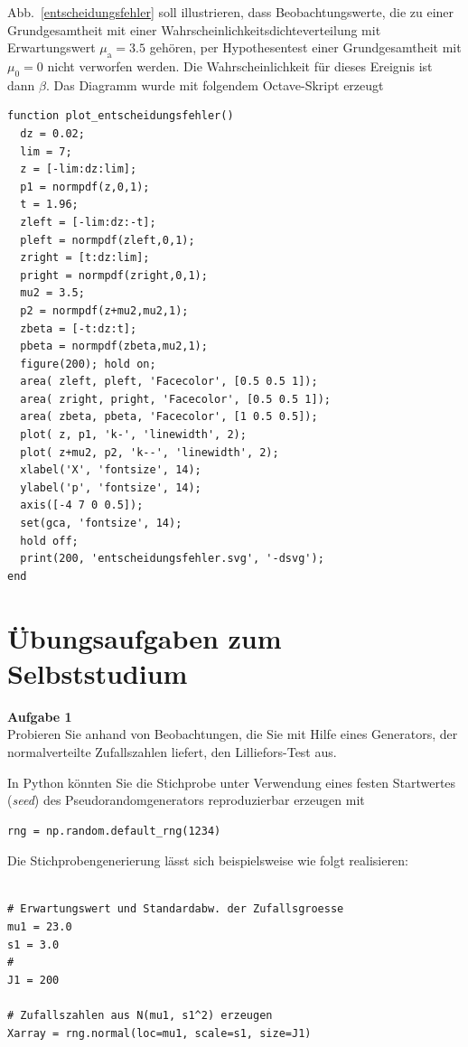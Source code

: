 Abb.~\ref{entscheidungsfehler} soll illustrieren, dass Beobachtungswerte, die zu einer
Grundgesamtheit mit einer Wahrscheinlichkeitsdichteverteilung mit Erwartungswert
$\mu_\mathrm{a} = 3.5$ gehören, per Hypothesentest einer Grundgesamtheit mit $\mu_0 = 0$
nicht verworfen werden. Die Wahrscheinlichkeit für dieses Ereignis ist dann $\beta$.
Das Diagramm wurde mit folgendem Octave-Skript erzeugt

\begin{lstlisting}[style=Matlab]
function plot_entscheidungsfehler()
  dz = 0.02;
  lim = 7;
  z = [-lim:dz:lim];
  p1 = normpdf(z,0,1);
  t = 1.96;
  zleft = [-lim:dz:-t];
  pleft = normpdf(zleft,0,1);
  zright = [t:dz:lim];
  pright = normpdf(zright,0,1);
  mu2 = 3.5;
  p2 = normpdf(z+mu2,mu2,1);
  zbeta = [-t:dz:t];
  pbeta = normpdf(zbeta,mu2,1);
  figure(200); hold on;
  area( zleft, pleft, 'Facecolor', [0.5 0.5 1]);
  area( zright, pright, 'Facecolor', [0.5 0.5 1]);
  area( zbeta, pbeta, 'Facecolor', [1 0.5 0.5]);
  plot( z, p1, 'k-', 'linewidth', 2);
  plot( z+mu2, p2, 'k--', 'linewidth', 2);
  xlabel('X', 'fontsize', 14);
  ylabel('p', 'fontsize', 14);
  axis([-4 7 0 0.5]);
  set(gca, 'fontsize', 14);
  hold off;
  print(200, 'entscheidungsfehler.svg', '-dsvg');
end
\end{lstlisting}

\pagebreak

\section{Übungsaufgaben zum Selbststudium}
\label{AufgVorl5}

\textbf{Aufgabe 1}\\

Probieren Sie anhand von Beobachtungen, die Sie mit Hilfe eines Generators, der
normalverteilte Zufallszahlen liefert, den Lilliefors-Test aus.

In Python könnten Sie die Stichprobe unter Verwendung eines festen 
Startwertes (\textsl{seed}) des Pseudorandomgenerators reproduzierbar erzeugen mit 

\begin{lstlisting}[style=Python]
rng = np.random.default_rng(1234)
\end{lstlisting}

Die Stichprobengenerierung lässt sich beispielsweise wie folgt realisieren:

\begin{lstlisting}[style=Python]

# Erwartungswert und Standardabw. der Zufallsgroesse
mu1 = 23.0
s1 = 3.0
# 
J1 = 200

# Zufallszahlen aus N(mu1, s1^2) erzeugen
Xarray = rng.normal(loc=mu1, scale=s1, size=J1)
\end{lstlisting}

